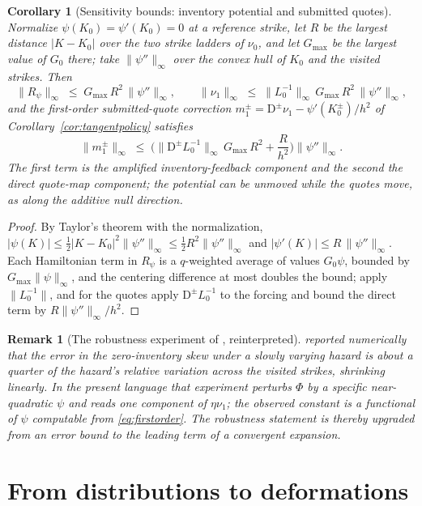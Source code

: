 \documentclass[11pt]{article}
\newtheorem{corollary}{Corollary}
\newtheorem{remark}{Remark}
\begin{document}
\begin{corollary}[Sensitivity bounds: inventory potential and submitted quotes]\label{cor:policysens}
Normalize $\psi(K_0) = \psi'(K_0) = 0$ at a reference strike, let $R$ be the largest distance $|K - K_0|$ over the two strike ladders of $\nu_0$, and let $G_{\max}$ be the largest value of $G_0$ there; take $\|\psi''\|_\infty$ over the convex hull of $K_0$ and the visited strikes. Then
\[
\|R_\psi\|_\infty \;\le\; G_{\max}\, R^2\, \|\psi''\|_\infty,
\qquad
\|\nu_1\|_\infty \;\le\; \|L_0^{-1}\|_\infty\, G_{\max}\, R^2\, \|\psi''\|_\infty ,
\]
and the first-order submitted-quote correction $m_1^{\pm} = \mathrm{D}^{\pm}\nu_1 - \psi'(K^{\pm}_0)/h^2$ of Corollary~\ref{cor:tangentpolicy} satisfies
\[
\|m_1^{\pm}\|_\infty \;\le\; \Big( \|\mathrm{D}^{\pm} L_0^{-1}\|_\infty\, G_{\max}\, R^2 + \frac{R}{h^2} \Big) \|\psi''\|_\infty .
\]
The first term is the amplified inventory-feedback component and the second the direct quote-map component; the potential can be unmoved while the quotes move, as along the additive null direction.
\end{corollary}

\begin{proof}
By Taylor's theorem with the normalization, $|\psi(K)| \le \tfrac12 |K - K_0|^2 \|\psi''\|_\infty \le \tfrac12 R^2 \|\psi''\|_\infty$ and $|\psi'(K)| \le R\,\|\psi''\|_\infty$. Each Hamiltonian term in $R_\psi$ is a $q$-weighted average of values $G_0\psi$, bounded by $G_{\max}\|\psi\|_\infty$, and the centering difference at most doubles the bound; apply $\|L_0^{-1}\|$, and for the quotes apply $\mathrm{D}^{\pm}L_0^{-1}$ to the forcing and bound the direct term by $R\|\psi''\|_\infty/h^2$.
\end{proof}

\begin{remark}[The robustness experiment of \citet{cotton2026skew}, reinterpreted]
\citet{cotton2026skew} reported numerically that the error in the zero-inventory skew under a slowly varying hazard is about a quarter of the hazard's relative variation across the visited strikes, shrinking linearly. In the present language that experiment perturbs $\Phi$ by a specific near-quadratic $\psi$ and reads one component of $\eta\nu_1$; the observed constant is a functional of $\psi$ computable from \eqref{eq:firstorder}. The robustness statement is thereby upgraded from an error bound to the leading term of a convergent expansion.
\end{remark}

\section{From distributions to deformations}\label{sec:envelope}
\end{document}
